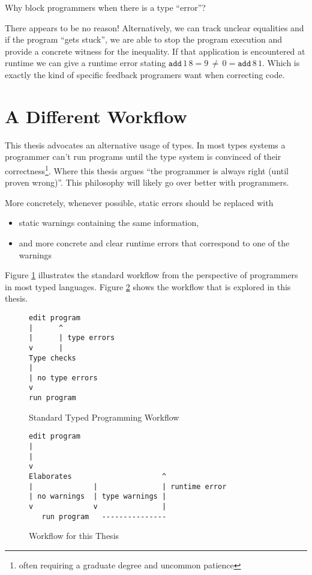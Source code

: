 Why block programmers when there is a type ``error''? 

There appears to be no reason! Alternatively, we can track unclear equalities and if the program ``gets stuck'', we are able to stop the program execution and provide a concrete witness for the inequality.
If that application is encountered at runtime we can give a runtime error stating $\mathtt{add}\,1\,8=9\,\neq\,0=\mathtt{add}\,8\,1$.
Which is exactly the kind of specific feedback programers want when correcting code.

\section{A Different Workflow}

This thesis advocates an alternative usage of types. In most types systems a programmer can't run programs until the type system is convinced of their correctness\footnote{
 often requiring a graduate degree and uncommon patience}.
Where this thesis argues ``the programmer is always right (until proven wrong)''.
This philosophy will likely go over better with programmers.

More concretely, whenever possible, static errors should be replaced with
\begin{itemize}
\item static warnings containing the same information,
\item and more concrete and clear runtime errors that correspond to one of the warnings
\end{itemize}
Figure \ref{fig:intro-standard-workflow} illustrates the standard workflow from the perspective of programmers in most typed languages.
Figure \ref{fig:intro-thesis-workflow} shows the workflow that is explored in this thesis.

\begin{figure}
\begin{lstlisting}
edit program
|      ^
|      | type errors
v      |
Type checks
|
| no type errors
v
run program
\end{lstlisting}


\caption{Standard Typed Programming Workflow}
\label{fig:intro-standard-workflow}
\end{figure}

\begin{figure}
\begin{lstlisting}
edit program
|     
|     
v
Elaborates                     ^
|              |               | runtime error
| no warnings  | type warnings |
v              v               |
   run program   ---------------
\end{lstlisting}


\caption{Workflow for this Thesis}
\label{fig:intro-thesis-workflow}
\end{figure}

